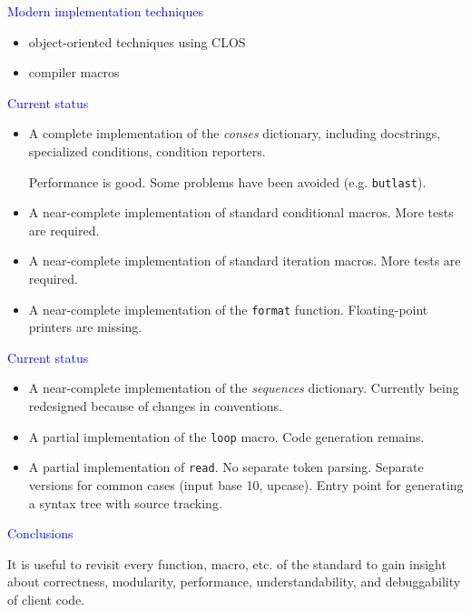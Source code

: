 \documentclass{slides}
\newcommand{\ti}[1]{\begin{center}\Large{\textcolor{blue}{#1}}\end{center}}
\begin{document}
\begin{slide}\ti{Modern implementation techniques}

\begin{itemize}
\item object-oriented techniques using CLOS
\item compiler macros
\end{itemize}

\vfill\end{slide}
\begin{slide}\ti{Current status}
\begin{itemize}
\item A complete implementation of the \emph{conses} dictionary,
  including docstrings, specialized conditions, condition reporters. 

Performance is good.  Some problems have been avoided
(e.g. \texttt{butlast}). 

\item A near-complete implementation of standard conditional macros.
  More tests are required.
\item A near-complete implementation of standard iteration macros.
  More tests are required.
\item A near-complete implementation of the \texttt{format} function.
  Floating-point printers are missing. 
\end{itemize}
\vfill\end{slide}
\begin{slide}\ti{Current status}
\begin{itemize}
\item A near-complete implementation of the \emph{sequences}
  dictionary.  Currently being redesigned because of changes in
  conventions. 
\item A partial implementation of the \texttt{loop} macro.  Code
  generation remains.  
\item A partial implementation of \texttt{read}.  No separate token
  parsing.  Separate versions for common cases (input base 10,
  upcase).  Entry point for generating a syntax tree with source
  tracking. 
\end{itemize}
\vfill\end{slide}
\begin{slide}\ti{Conclusions}

It is useful to revisit every function, macro, etc. of the standard to
gain insight about correctness, modularity, performance,
understandability, and debuggability of client code.  

\vfill\end{slide}
\end{document}
